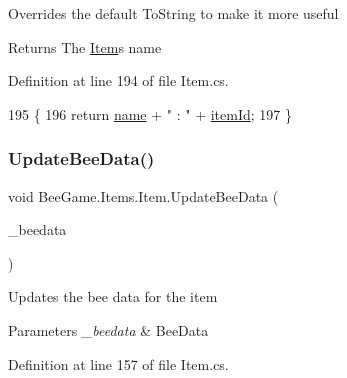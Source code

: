 Overrides the default To\+String to make it more useful 

\begin{DoxyReturn}{Returns}
The \hyperlink{struct_bee_game_1_1_items_1_1_item}{Item}\textquotesingle{}s name
\end{DoxyReturn}


Definition at line 194 of file Item.\+cs.


\begin{DoxyCode}
195         \{
196             \textcolor{keywordflow}{return} \hyperlink{struct_bee_game_1_1_items_1_1_item_a0b0bd7eb510757f650f1be3d05b23fc8}{name} + \textcolor{stringliteral}{" : "} + \hyperlink{struct_bee_game_1_1_items_1_1_item_aa85bfeab893271c26f8ca41b638ada1c}{itemId};
197         \}
\end{DoxyCode}
\mbox{\label{struct_bee_game_1_1_items_1_1_item_a4bc320f90a3fb06467046eedeb88ed13}} 
\subsubsection{\texorpdfstring{Update\+Bee\+Data()}{UpdateBeeData()}}
{\footnotesize\ttfamily void Bee\+Game.\+Items.\+Item.\+Update\+Bee\+Data (\begin{DoxyParamCaption}\item[{\hyperlink{struct_bee_game_1_1_bee_1_1_bee_data}{Bee\+Data}}]{\+\_\+beedata }\end{DoxyParamCaption})}



Updates the bee data for the item 


\begin{DoxyParams}{Parameters}
{\em \+\_\+beedata} & Bee\+Data\\
\hline
\end{DoxyParams}


Definition at line 157 of file Item.\+cs.


